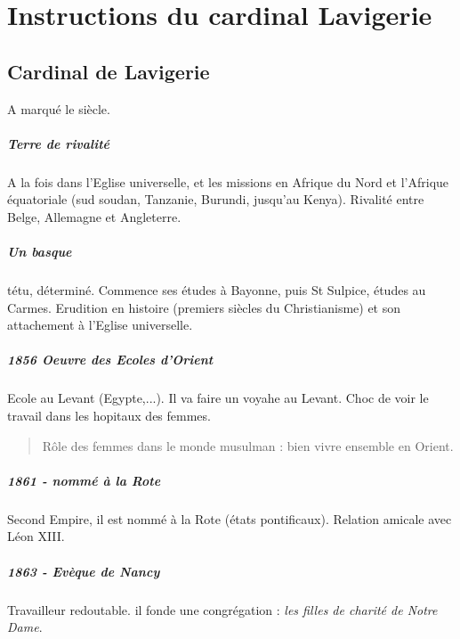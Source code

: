 \chapter{Instructions du cardinal Lavigerie}


\section{Cardinal de Lavigerie}

A marqué le siècle. 

\paragraph{Terre de rivalité} A la fois dans l'Eglise universelle, et les missions en Afrique du Nord et l'Afrique équatoriale (sud soudan, Tanzanie, Burundi, jusqu'au Kenya). Rivalité entre Belge, Allemagne et Angleterre. 

\paragraph{Un basque} tétu, déterminé. Commence ses études à Bayonne, puis St Sulpice, études au Carmes. Erudition en histoire (premiers siècles du Christianisme) et son attachement à l'Eglise universelle.

\paragraph{1856 Oeuvre des Ecoles d'Orient} Ecole au Levant (Egypte,...). Il va faire un voyahe au Levant. Choc de voir le travail dans les hopitaux des femmes.
\begin{quote}
    Rôle des femmes dans le monde musulman : bien vivre ensemble en Orient.
\end{quote}

\paragraph{1861 - nommé à la Rote} Second Empire, il est nommé à la Rote (états pontificaux). Relation amicale avec Léon XIII.

\paragraph{1863 - Evèque de Nancy} Travailleur redoutable. il fonde une congrégation : \textit{les filles de charité de Notre Dame}. 

